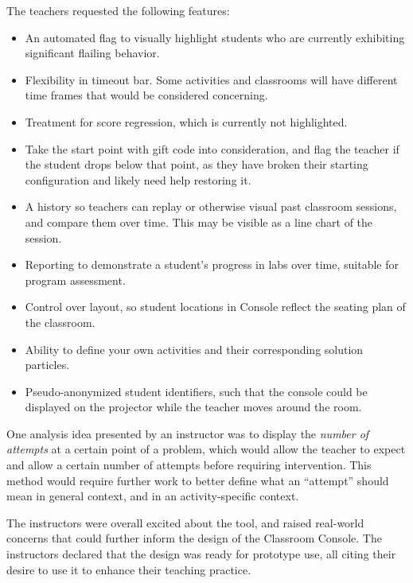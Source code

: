 The teachers requested the following features:
\begin{itemize}
\item An automated flag to visually highlight students who are currently exhibiting significant flailing behavior.
\item Flexibility in timeout bar. Some activities and classrooms will have different time frames that would be considered concerning.
\item Treatment for score regression, which is currently not highlighted. 
\item Take the start point with gift code into consideration, and flag the teacher if the student drops below that point, as they have broken their starting configuration and likely need help restoring it.
\item A history so teachers can replay or otherwise visual past classroom sessions, and compare them over time. This may be visible as a line chart of the session.
\item Reporting to demonstrate a student's progress in labs over time, suitable for program assessment. 
\item Control over layout, so student locations in Console reflect the seating plan of the classroom.
\item Ability to define your own activities and their corresponding solution particles.
\item Pseudo-anonymized student identifiers, such that the console could be displayed on the projector while the teacher moves around the room.
\end{itemize}

One analysis idea presented by an instructor was to display the \emph{number of attempts} at a certain point of a problem, which would allow the teacher to expect and allow a certain number of attempts before requiring intervention. This method would require further work to better define what an ``attempt'' should mean in general context, and in an activity-specific context.

The instructors were overall excited about the tool, and raised real-world concerns that could further inform the design of the Classroom Console. The instructors declared that the design was ready for prototype use, all citing their desire to use it to enhance their teaching practice.

